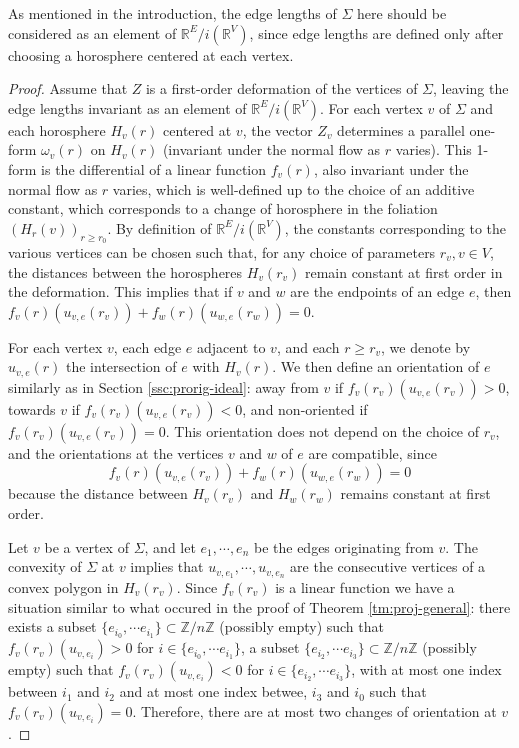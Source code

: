 \documentclass[notitlepage,twoside,a4paper]{amsart}
\theoremstyle{named}
\newcommand{\R}{{\mathbb R}}
\newcommand{\Z}{{\mathbb Z}}
\begin{document}
As mentioned in the introduction, the edge lengths of $\Sigma$ here should be considered as an element of $\R^E/i(\R^V)$, since edge lengths are defined only after choosing a horosphere centered at each vertex.

\begin{proof}
  Assume that $Z$ is a first-order deformation of the vertices of $\Sigma$, leaving the edge lengths invariant as an element of $\R^E/i(\R^V)$. For each vertex $v$ of $\Sigma$ and each horosphere $H_v(r)$ centered at $v$, the vector $Z_v$ determines a parallel one-form $\omega_v(r)$ on $H_v(r)$ (invariant under the normal flow as $r$ varies). This 1-form is the differential of a linear function $f_v(r)$, also invariant under the normal flow as $r$ varies, which is well-defined up to the choice of an additive constant, which corresponds to a change of horosphere in the foliation $(H_r(v))_{r\geq r_0}$. By definition of $\R^E/i(\R^V)$, the constants corresponding to the various vertices can be chosen such that, for any choice of parameters $r_v, v\in V$, the distances between the horospheres $H_v(r_v)$ remain constant at first order in the deformation. This implies that if $v$ and $w$ are the endpoints of an edge $e$, then $f_v(r)(u_{v,e}(r_v)) + f_w(r)(u_{w,e}(r_w))=0$.
  
  For each vertex $v$, each edge $e$ adjacent to $v$, and each $r\geq r_v$, we denote by $u_{v,e}(r)$ the intersection of $e$ with $H_v(r)$. We then define an orientation of $e$ similarly as in Section \ref{ssc:prorig-ideal}: away from $v$ if $f_v(r_v)(u_{v,e}(r_v))>0$, towards $v$ if $f_v(r_v)(u_{v,e}(r_v))<0$, and non-oriented if $f_v(r_v)(u_{v,e}(r_v))=0$. This orientation does not depend on the choice of $r_v$, and the orientations at the vertices $v$ and $w$ of $e$ are compatible, since
  $$ f_v(r)(u_{v,e}(r_v)) + f_w(r)(u_{w,e}(r_w))=0 $$
because the distance between $H_v(r_v)$ and $H_w(r_w)$ remains constant at first order.

Let $v$ be a vertex of $\Sigma$, and let $e_1, \cdots, e_n$ be the edges originating from $v$. The convexity of $\Sigma$ at $v$ implies that $u_{v,e_1}, \cdots, u_{v, e_n}$ are the consecutive vertices of a convex polygon in $H_v(r_v)$. Since $f_v(r_v)$ is a linear function we have a situation similar to what occured in the proof of Theorem \ref{tm:proj-general}: there exists a subset $\{ e_{i_0}, \cdots e_{i_1}\}\subset \Z/n\Z$ (possibly empty) such that $f_v(r_v)(u_{v, e_i})>0$ for $i\in \{ e_{i_0}, \cdots e_{i_1}\}$, a subset $\{ e_{i_2}, \cdots e_{i_3}\}\subset \Z/n\Z$ (possibly empty) such that $f_v(r_v)(u_{v, e_i})<0$ for $i\in \{ e_{i_2}, \cdots e_{i_3}\}$, with at most one index between $i_1$ and $i_2$ and at most one index betwee, $i_3$ and $i_0$ such that $f_v(r_v)(u_{v, e_i})=0$. Therefore, there are at most two changes of orientation at $v$.


\end{proof}
\end{document}
